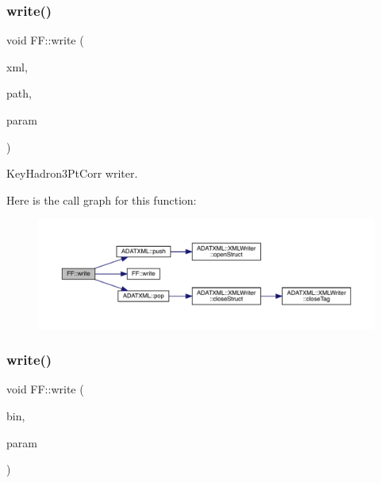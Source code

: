 \subsubsection{\texorpdfstring{write()}{write()}\hspace{0.1cm}{\footnotesize\ttfamily [10/13]}}
{\footnotesize\ttfamily void F\+F\+::write (\begin{DoxyParamCaption}\item[{X\+M\+L\+Writer \&}]{xml,  }\item[{const std\+::string \&}]{path,  }\item[{const \mbox{\hyperlink{structFF_1_1KeyHadron3PtCorr__t}{Key\+Hadron3\+Pt\+Corr\+\_\+t}} \&}]{param }\end{DoxyParamCaption})}



Key\+Hadron3\+Pt\+Corr writer. 

Here is the call graph for this function\+:
\nopagebreak
\begin{figure}[H]
\begin{center}
\leavevmode
\includegraphics[width=350pt]{d5/da6/namespaceFF_a9e6eed897710dbad982d5a699a70f857_cgraph}
\end{center}
\end{figure}
\mbox{\label{namespaceFF_a1b83f6ebd714e1d672d8c425605ff1de}} 
\subsubsection{\texorpdfstring{write()}{write()}\hspace{0.1cm}{\footnotesize\ttfamily [11/13]}}
{\footnotesize\ttfamily void F\+F\+::write (\begin{DoxyParamCaption}\item[{\mbox{\hyperlink{classADATIO_1_1BinaryWriter}{Binary\+Writer}} \&}]{bin,  }\item[{const \mbox{\hyperlink{structFF_1_1KeyHadron2PtCorr__t}{Key\+Hadron2\+Pt\+Corr\+\_\+t}} \&}]{param }\end{DoxyParamCaption})}



